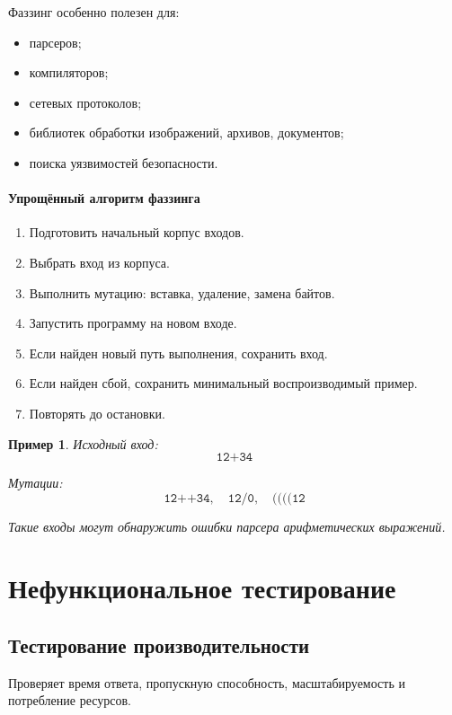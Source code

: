 \documentclass[12pt,a4paper]{article}
\newtheorem{example}{Пример}
\begin{document}
Фаззинг особенно полезен для:

\begin{itemize}
    \item парсеров;
    \item компиляторов;
    \item сетевых протоколов;
    \item библиотек обработки изображений, архивов, документов;
    \item поиска уязвимостей безопасности.
\end{itemize}

\paragraph{Упрощённый алгоритм фаззинга}

\begin{enumerate}
    \item Подготовить начальный корпус входов.
    \item Выбрать вход из корпуса.
    \item Выполнить мутацию: вставка, удаление, замена байтов.
    \item Запустить программу на новом входе.
    \item Если найден новый путь выполнения, сохранить вход.
    \item Если найден сбой, сохранить минимальный воспроизводимый пример.
    \item Повторять до остановки.
\end{enumerate}

\begin{example}
Исходный вход:
\[
\texttt{12+34}
\]

Мутации:
\[
\texttt{12++34},\quad
\texttt{12/0},\quad
\texttt{((((12}
\]

Такие входы могут обнаружить ошибки парсера арифметических выражений.
\end{example}

\section{Нефункциональное тестирование}

\subsection{Тестирование производительности}

Проверяет время ответа, пропускную способность, масштабируемость и потребление ресурсов.
\end{document}
